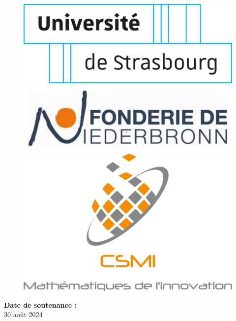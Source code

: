 \documentclass[12pt]{article}
\begin{document}
\begin{titlepage}
    \begin{figure}[b!]
    \centering
    \vfill
    \includegraphics[scale=0.16]{Images/Presentation/logo-unistra.pdf}
    \hspace{0.5 cm}
    \includegraphics[scale=0.16]{Images/Presentation/logo-Fonderie.pdf}
    \hspace{0.5 cm}
    \includegraphics[scale=0.16]{Images/Presentation/logoCSMI.pdf}
    \end{figure}
    
    {\large \textbf{Date de soutenance :}} \\
    {\large 30 août 2024} \\[1cm]
    
\end{titlepage}
\end{document}
